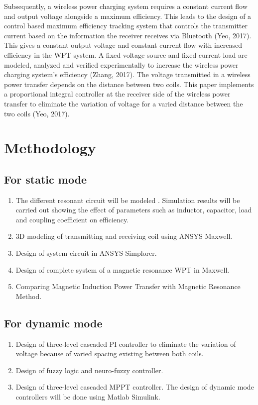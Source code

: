 \documentclass[12pt]{article}
\begin{document}
Subsequently, a wireless power charging system requires a constant current flow and output
voltage alongside a maximum efficiency. This leads to the design of a control based maximum
efficiency tracking system that controls the transmitter current based on the information the receiver
receives via Bluetooth (Yeo, 2017). This gives a constant output voltage and constant current flow
with increased efficiency in the WPT system. A fixed voltage source and fixed current load are
modeled, analyzed and verified experimentally to increase the wireless power charging system's 
efficiency (Zhang, 2017). The voltage transmitted in a wireless power transfer depends on the
distance between two coils. This paper implements a proportional integral controller at the receiver
side of the wireless power transfer to eliminate the variation of voltage for a varied distance between
the two coils (Yeo, 2017). \cite{a2019}

\section{Methodology}
\subsection{For static mode}
\begin{enumerate}
	\item The different resonant circuit will be modeled . Simulation results will be carried out showing the effect of parameters such as inductor, capacitor, load and coupling coefficient on efficiency. 
	\item 3D modeling of transmitting and receiving coil using ANSYS Maxwell. 
	\item Design of system circuit in ANSYS Simplorer. 
	\item Design of complete system of a magnetic resonance WPT in Maxwell. 
	\item Comparing Magnetic Induction Power Transfer with Magnetic Resonance Method. 
\end{enumerate}

\subsection{For dynamic mode}
\begin{enumerate}
	\item Design of three-level cascaded PI controller  to eliminate the variation of voltage because of varied spacing existing between both coils.
	\item Design of fuzzy logic and neuro-fuzzy controller.
	\item Design of three-level cascaded MPPT controller. 
		The design of dynamic mode controllers will be done using Matlab Simulink. 
\end{enumerate}
\end{document}
